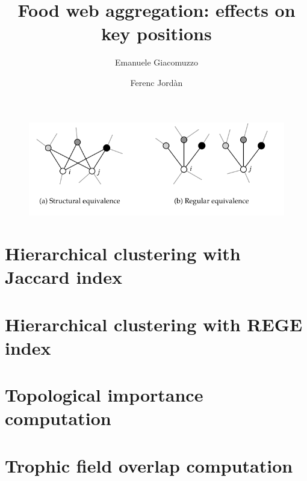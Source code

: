 \documentclass[twocolumn]{article}
\title{Food web aggregation: effects on key positions}
\author[1]{Emanuele Giacomuzzo}
\author[1]{Ferenc Jordàn}
\affil[1]{Stazione Zoologica Anton Dohrn, Napoli, 80122, Italy}
\date{}
\begin{document}
\maketitle

						\begin{figure}[htbp]%
							\centering
							\includegraphics[width=1.0\linewidth]{reg_struct_equivalence}
							\caption{}
							\label{fig:equivalences}
						\end{figure} %






\onecolumn
\begin{appendices}
	\section{Hierarchical clustering with Jaccard index} \label{appendix:jaccard}
	
	\section{Hierarchical clustering with REGE index} \label{appendix:rege}
	
	\section{Topological importance computation} \label{appendix:TI}
	
	\section{Trophic field overlap computation} \label{appendix:TO}
	
\end{appendices}
\end{document}
